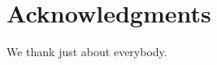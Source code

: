 \documentclass[10pt,letterpaper]{article}
\begin{document}



\newpage









\section*{Acknowledgments}
We thank just about everybody.

\nolinenumbers




\end{document}
